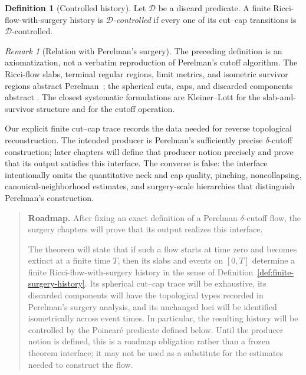 \documentclass[10pt]{coll-l}
\newenvironment{roadmap}[1]{%
  \begin{quote}\small\noindent\textbf{Roadmap.} #1\par\medskip\noindent
}{\end{quote}}
\theoremstyle{definition}
\newtheorem{definition}[theorem]{Definition}
\theoremstyle{remark}
\newtheorem{remark}[theorem]{Remark}
\numberwithin{section}{chapter}
\numberwithin{equation}{chapter}
\begin{document}
\begin{definition}[Controlled history]
\label{def:controlled-history}
Let $\mathcal D$ be a discard predicate.  A finite Ricci-flow-with-surgery
history is \emph{$\mathcal D$-controlled} if every one of its cut--cap
transitions is $\mathcal D$-controlled.
\end{definition}

\begin{remark}[Relation with Perelman's surgery]
\label{rem:classical-surgery}
The preceding definition is an axiomatization, not a verbatim reproduction
of Perelman's cutoff algorithm.  The Ricci-flow slabs, terminal regular
regions, limit metrics, and isometric survivor regions abstract
Perelman~\cite[\S\S3 and~4.1]{Perelman2}; the spherical cuts, caps, and discarded
components abstract \cite[\S4.4]{Perelman2}.  The closest systematic
formulations are Kleiner--Lott
\cite[Definition~68.1]{MR2460872} for the slab-and-survivor structure and
\cite[Definition~73.1]{MR2460872} for the cutoff operation.

Our explicit finite cut--cap trace records the data needed for reverse
topological reconstruction.  The intended producer is Perelman's
sufficiently precise $\delta$-cutoff construction; later chapters will define
that producer notion precisely and prove that its output satisfies this
interface.  The converse is false: the interface intentionally omits the
quantitative neck and cap quality, pinching, noncollapsing,
canonical-neighborhood estimates, and surgery-scale hierarchies that
distinguish Perelman's construction.
\end{remark}

\begin{roadmap}{After fixing an exact definition of a Perelman
$\delta$-cutoff flow, the surgery chapters will prove that its output realizes
this interface.}
The theorem will state that if such a flow starts at time zero and becomes
extinct at a finite time $T$, then its slabs and events on $[0,T]$ determine a
finite Ricci-flow-with-surgery history in the sense of
Definition~\ref{def:finite-surgery-history}.  Its spherical cut--cap trace
will be exhaustive, its discarded components will have the topological types
recorded in Perelman's surgery analysis, and its unchanged loci will be
identified isometrically across event times.  In particular, the resulting
history will be controlled by the Poincar\'e predicate defined below.  Until
the producer notion is defined, this is a roadmap obligation rather than a
frozen theorem interface; it may not be used as a substitute for the
estimates needed to construct the flow.
\end{roadmap}
\end{document}
